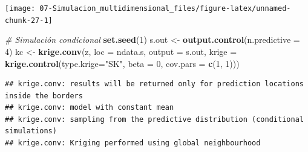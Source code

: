 \documentclass[]{book}
\newenvironment{Shaded}{\begin{snugshade}}{\end{snugshade}}
\newcommand{\KeywordTok}[1]{\textcolor[rgb]{0.13,0.29,0.53}{\textbf{#1}}}
\newcommand{\DataTypeTok}[1]{\textcolor[rgb]{0.13,0.29,0.53}{#1}}
\newcommand{\DecValTok}[1]{\textcolor[rgb]{0.00,0.00,0.81}{#1}}
\newcommand{\StringTok}[1]{\textcolor[rgb]{0.31,0.60,0.02}{#1}}
\newcommand{\CommentTok}[1]{\textcolor[rgb]{0.56,0.35,0.01}{\textit{#1}}}
\newcommand{\NormalTok}[1]{#1}
\theoremstyle{definition}
\theoremstyle{definition}
\theoremstyle{definition}
\theoremstyle{remark}
\begin{document}
\begin{center}\texttt{[image: 07-Simulacion\_multidimensional\_files/figure-latex/unnamed-chunk-27-1]} \end{center}

\begin{Shaded}
\begin{Highlighting}[]
\CommentTok{# Simulación condicional}
\KeywordTok{set.seed}\NormalTok{(}\DecValTok{1}\NormalTok{)}
\NormalTok{s.out <-}\StringTok{ }\KeywordTok{output.control}\NormalTok{(}\DataTypeTok{n.predictive =} \DecValTok{4}\NormalTok{)}
\NormalTok{kc <-}\StringTok{ }\KeywordTok{krige.conv}\NormalTok{(z, }\DataTypeTok{loc =}\NormalTok{ ndata.s, }\DataTypeTok{output =}\NormalTok{ s.out,}
                 \DataTypeTok{krige =} \KeywordTok{krige.control}\NormalTok{(}\DataTypeTok{type.krige=}\StringTok{"SK"}\NormalTok{, }\DataTypeTok{beta =} \DecValTok{0}\NormalTok{, }\DataTypeTok{cov.pars =} \KeywordTok{c}\NormalTok{(}\DecValTok{1}\NormalTok{, }\DecValTok{1}\NormalTok{)))}
\end{Highlighting}
\end{Shaded}

\begin{verbatim}
## krige.conv: results will be returned only for prediction locations inside the borders
## krige.conv: model with constant mean
## krige.conv: sampling from the predictive distribution (conditional simulations)
## krige.conv: Kriging performed using global neighbourhood
\end{verbatim}
\end{document}
